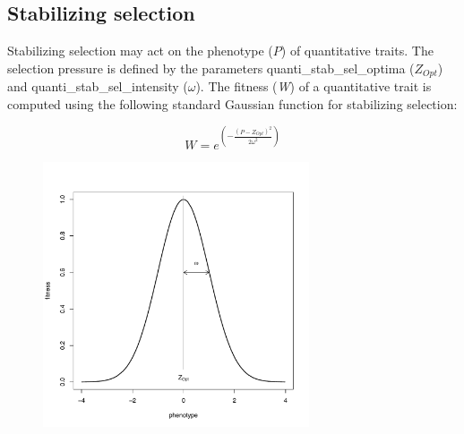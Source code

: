 \documentclass[letterpaper,12pt,oneside]{book}
\begin{document}
\subsection{Stabilizing selection}
Stabilizing selection may act on the phenotype ($P$) of quantitative traits. The selection pressure is defined by the parameters \textsf{quanti\_stab\_sel\_optima} ($Z_{Opt}$) and \textsf{quanti\_stab\_sel\_intensity} ($\omega$). The fitness (\textit{W}) of a quantitative trait is computed using the following standard Gaussian function for stabilizing selection: 

\[W = e^{\left(-\frac{\left(P-Z_{Opt}\right)^2}{2\omega^{2}}\right)} \]

\begin{figure}[h]
	\centering
		\includegraphics[width=0.70\textwidth]{stabilizing-selection.pdf}
	\label{fig:stabilizing-selection}
\end{figure}
\end{document}

